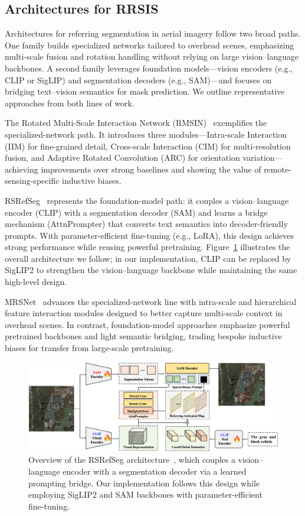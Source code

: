 \subsection{Architectures for RRSIS}

Architectures for referring segmentation in aerial imagery follow two broad paths. One family builds specialized networks tailored to overhead scenes, emphasizing multi-scale fusion and rotation handling without relying on large vision–language backbones. A second family leverages foundation models—vision encoders (e.g., CLIP or SigLIP) and segmentation decoders (e.g., SAM)—and focuses on bridging text–vision semantics for mask prediction. We outline representative approaches from both lines of work.

The Rotated Multi-Scale Interaction Network (RMSIN)~\cite{liu2024rotated} exemplifies the specialized-network path. It introduces three modules—Intra-scale Interaction (IIM) for fine-grained detail, Cross-scale Interaction (CIM) for multi-resolution fusion, and Adaptive Rotated Convolution (ARC) for orientation variation—achieving improvements over strong baselines and showing the value of remote-sensing-specific inductive biases.

RSRefSeg~\cite{chen2025rsrefseg} represents the foundation-model path: it couples a vision–language encoder (CLIP) with a segmentation decoder (SAM) and learns a bridge mechanism (AttnPrompter) that converts text semantics into decoder-friendly prompts. With parameter-efficient fine-tuning (e.g., LoRA), this design achieves strong performance while reusing powerful pretraining. Figure~\ref{fig:rsrefseg_arch} illustrates the overall architecture we follow; in our implementation, CLIP can be replaced by SigLIP2 to strengthen the vision–language backbone while maintaining the same high-level design.

MRSNet~\cite{yang2024large} advances the specialized-network line with intra-scale and hierarchical feature interaction modules designed to better capture multi-scale context in overhead scenes. In contrast, foundation-model approaches emphasize powerful pretrained backbones and light semantic bridging, trading bespoke inductive biases for transfer from large-scale pretraining.

\begin{figure}[H]
\centering
\includegraphics[width=\columnwidth]{./images/RSRefSeg.png}
\caption{Overview of the RSRefSeg architecture~\cite{chen2025rsrefseg}, which couples a vision–language encoder with a segmentation decoder via a learned prompting bridge. Our implementation follows this design while employing SigLIP2 and SAM backbones with parameter-efficient fine-tuning.}
\label{fig:rsrefseg_arch}
\end{figure}
